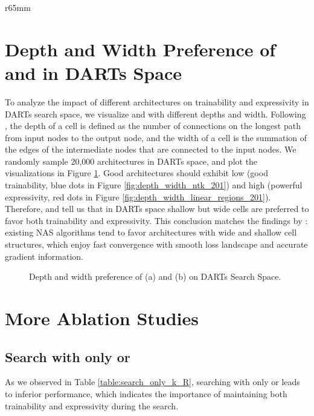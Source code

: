 \documentclass{article} \usepackage{iclr2021_conference,times}
\begin{document}
\begin{wrapfigure}{r}{65mm}
\begin{center}
\section{Depth and Width Preference of  and  in DARTs Space}

To analyze the impact of different architectures on trainability and expressivity in DARTs search space, we visualize  and  with different depths and width. Following \citet{shu2019understanding},  
the depth of a cell is defined as the number of connections on the longest path from input nodes to the output node, and the width of a cell is the summation of the edges of the intermediate nodes that are connected to the input nodes. We randomly sample 20,000 architectures in DARTs space, and plot the visualizations in Figure \ref{fig:depth_width_201}. Good architectures should exhibit low  (good trainability, blue dots in Figure \ref{fig:depth_width_ntk_201}) and high  (powerful expressivity, red dots in Figure \ref{fig:depth_width_linear_regions_201}). Therefore,  and  tell us that in DARTs space shallow but wide cells are preferred to favor both trainability and expressivity. This conclusion matches the findings by \citet{shu2019understanding}: existing NAS algorithms tend to favor architectures with wide and shallow cell structures, which enjoy fast convergence with smooth loss landscape and accurate gradient information.

\begin{figure}[h!]
\centering
{}
\caption{Depth and width preference of (a)  and (b)  on DARTs Search Space.}
\label{fig:depth_width_201}
\end{figure}

\section{More Ablation Studies}
\subsection{Search with only  or }\label{sec:appendix_indicator_option}

As we observed in Table \ref{table:search_only_k_R}, searching with only  or  leads to inferior performance, which indicates the importance of maintaining both trainability and expressivity during the search.


\end{center}
\end{wrapfigure}
\end{document}
